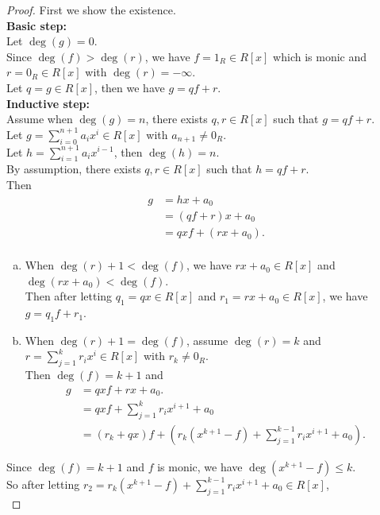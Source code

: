 \documentclass{amsart}
\theoremstyle{plain}
\theoremstyle{definition}
\begin{document}
\begin{proof}	
  First we show the existence.\\
  \textbf{Basic step:}\\ Let $\deg(g) = 0$.\\
  Since $\deg(f) > \deg(r)$, we have $f = 1_R \in R[x]$ which is monic and $r = 0_R \in R[x]$ with $\deg(r) = -\infty$.\\
  Let $q = g \in R[x]$, then we have $g = qf + r$.\\
  \textbf{Inductive step:}\\ Assume when $\deg(g) =n$, there exists $q,r \in R[x]$ such that $g = qf+r$.\\
  Let $g = \sum_{i=0}^{n+1}a_ix^i \in R[x]$ with $a_{n+1} \neq 0_R$.\\
  Let $h = \sum_{i=1}^{n+1}a_ix^{i-1}$, then $\deg(h) = n $. \\
  By assumption, there exists $q,r \in R[x]$ such that $h=qf+r$.\\
  Then
  \begin{align*}
  	g &= hx + a_0\\
  	  &= (qf+r)x+ a_0 \\
	  &=qxf + (rx + a_0). \\ 
  \end{align*}
  \begin{enumerate}[(a)]
  	  \item
  When $\deg(r)+1 < \deg(f)$, we have $rx + a_0 \in R[x]$ and $\deg(rx + a_0) < \deg(f)$.	\\
	Then after letting $q_1 = qx\in R[x]$ and $r_1 = rx + a_0\in R[x]$, we have $g = q_1f + r_1$.\\
	\item
  	When $\deg(r) + 1 = \deg(f)$, assume $\deg(r) =k$ and $r = \sum_{j=1}^kr_ix^i\in R[x] $ with $r_k \neq 0_R$.\\
  	Then $\deg(f) = k+1$ and 
  \begin{align*}
  	 g &=qxf + rx+a_0. \\
  	   &=qxf + \sum_{j=1}^kr_ix^{i+1} + a_0\\
	   	 &=(r_k+qx)f + \left(r_{k}\left(x^{k+1}-f\right) + \sum_{j=1}^{k-1}r_ix^{i+1} + a_0\right).
  \end{align*}
  \end{enumerate}
  Since $\deg(f) =k +1$ and $f$ is monic, we have $\deg\left(x^{k+1}-f\right) \leq k$.\\
  So after letting $r_2 = r_{k}\left(x^{k+1}-f\right) + \sum_{j=1}^{k-1}r_ix^{i+1} + a_0 \in R[x]$,\\

\end{proof}
\end{document}
